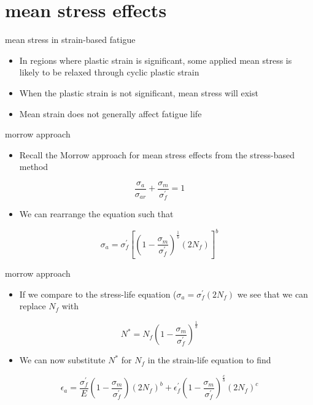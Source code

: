 \documentclass[
  letterpaper,
  ignorenonframetext,
  aspectratio=43,
  handout,
  12pt]{beamer}
\providecommand{\tightlist}{%
  \setlength{\itemsep}{0pt}\setlength{\parskip}{0pt}}
\providecommand{\tightlist}{%
\setlength{\itemsep}{0pt}\setlength{\parskip}{0pt}}
\begin{document}
\hypertarget{mean-stress-effects}{%
\section{mean stress effects}\label{mean-stress-effects}}

\begin{frame}{mean stress in strain-based fatigue}
\protect\hypertarget{mean-stress-in-strain-based-fatigue}{}
\begin{itemize}
\tightlist
\item
  In regions where plastic strain is significant, some applied mean
  stress is likely to be relaxed through cyclic plastic strain
\item
  When the plastic strain is not significant, mean stress will exist
\item
  Mean strain does not generally affect fatigue life
\end{itemize}
\end{frame}

\begin{frame}{morrow approach}
\protect\hypertarget{morrow-approach}{}
\begin{itemize}
\tightlist
\item
  Recall the Morrow approach for mean stress effects from the
  stress-based method
\end{itemize}

\[\frac{\sigma_a}{\sigma_{ar}} + \frac{\sigma_m}{\sigma_f^\prime} = 1\]

\begin{itemize}
\tightlist
\item
  We can rearrange the equation such that
\end{itemize}

\[\sigma_a = \sigma_f^\prime\left[\left(1-\frac{\sigma_m}{\sigma_f^\prime}\right)^\frac{1}{b}(2N_f)\right]^b\]
\end{frame}

\begin{frame}{morrow approach}
\protect\hypertarget{morrow-approach-1}{}
\begin{itemize}
\tightlist
\item
  If we compare to the stress-life equation
  (\(\sigma_a = \sigma_f^\prime (2N_f)\) we see that we can replace
  \(N_f\) with
\end{itemize}

\[N^* = N_f \left(1-\frac{\sigma_m}{\sigma_f^\prime}\right)^\frac{1}{b}\]

\begin{itemize}
\tightlist
\item
  We can now substitute \(N^*\) for \(N_f\) in the strain-life equation
  to find
\end{itemize}

\[\epsilon_a = \frac{\sigma_f^\prime}{E} \left(1-\frac{\sigma_m}{\sigma_f^\prime}\right)(2N_f)^b + \epsilon_f^\prime\left(1-\frac{\sigma_m}{\sigma_f^\prime}\right)^\frac{c}{b} (2 N_f)^c\]
\end{frame}
\end{document}
